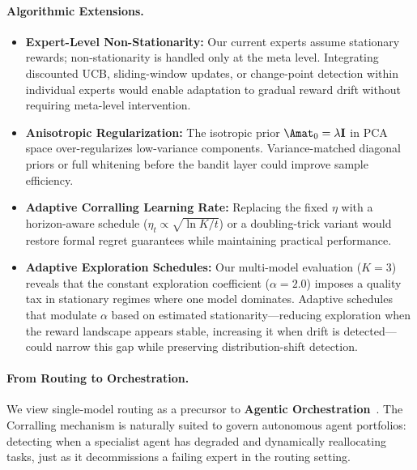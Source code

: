 \paragraph{Algorithmic Extensions.}
\begin{itemize}
    \item \textbf{Expert-Level Non-Stationarity:} Our current experts assume stationary rewards; non-stationarity is handled only at the meta level. Integrating discounted UCB, sliding-window updates, or change-point detection within individual experts would enable adaptation to gradual reward drift without requiring meta-level intervention.
    \item \textbf{Anisotropic Regularization:} The isotropic prior $\Amat_0 = \lambda \mathbf{I}$ in PCA space over-regularizes low-variance components. Variance-matched diagonal priors or full whitening before the bandit layer could improve sample efficiency.
    \item \textbf{Adaptive Corralling Learning Rate:} Replacing the fixed $\eta$ with a horizon-aware schedule ($\eta_t \propto \sqrt{\ln K / t}$) or a doubling-trick variant would restore formal regret guarantees while maintaining practical performance.
    \item \textbf{Adaptive Exploration Schedules:} Our multi-model evaluation ($K{=}3$) reveals that the constant exploration coefficient ($\alpha{=}2.0$) imposes a quality tax in stationary regimes where one model dominates. Adaptive schedules that modulate $\alpha$ based on estimated stationarity---reducing exploration when the reward landscape appears stable, increasing it when drift is detected---could narrow this gap while preserving distribution-shift detection.
\end{itemize}

\paragraph{From Routing to Orchestration.}
We view single-model routing as a precursor to \textbf{Agentic Orchestration}~\cite{wu2023autogen}. The Corralling mechanism is naturally suited to govern autonomous agent portfolios: detecting when a specialist agent has degraded and dynamically reallocating tasks, just as it decommissions a failing expert in the routing setting.
